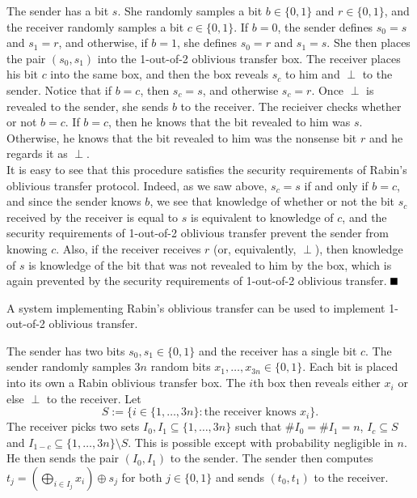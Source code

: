 \proof
The sender has a bit $s$. She randomly samples a bit $b \in \{0,1\}$ and $r \in \{0,1\}$, and the receiver randomly samples a bit $c \in \{0,1\}$. If $b = 0$, the sender defines $s_0 = s$ and $s_1 = r$, and otherwise, if $b = 1$, she defines $s_0 = r$ and $s_1 = s$. She then places the pair $(s_0, s_1)$ into the 1-out-of-2 oblivious transfer box. The receiver places his bit $c$ into the same box, and then the box reveals $s_c$ to him and $\perp$ to the sender. Notice that if $b = c$, then $s_c = s$, and otherwise $s_c = r$. Once $\perp$ is revealed to the sender, she sends $b$ to the receiver. The recieiver checks whether or not $b = c$. If $b = c$, then he knows that the bit revealed to him was $s$. Otherwise, he knows that the bit revealed to him was the nonsense bit $r$ and he regards it as $\perp$. \\

It is easy to see that this procedure satisfies the security requirements of Rabin's oblivious transfer protocol. Indeed, as we saw above, $s_c = s$ if and only if $b = c$, and since the sender knows $b$, we see that knowledge of whether or not the bit $s_c$ received by the receiver is equal to $s$ is equivalent to knowledge of $c$, and the security requirements of 1-out-of-2 oblivious transfer prevent the sender from knowing $c$. Also, if the receiver receives $r$ (or, equivalently, $\perp$), then knowledge of $s$ is knowledge of the bit that was not revealed to him by the box, which is again prevented by the security requirements of 1-out-of-2 oblivious transfer.  $\qed$

\begin{lemma}
A system implementing Rabin's oblivious transfer can be used to implement 1-out-of-2 oblivious transfer.
\end{lemma}

\proofsketch
The sender has two bits $s_0, s_1 \in \{0,1\}$ and the receiver has a single bit $c$. The sender randomly samples $3n$ random bits $x_1, \dotsc, x_{3n} \in \{0,1\}$. Each bit is placed into its own a Rabin oblivious transfer box. The $i$th box then reveals either $x_i$ or else $\perp$ to the receiver. Let 
\[ S := \{i \in \{1, \dotsc, 3n\} : \text{the receiver knows } x_i\}. \]
The receiver picks two sets $I_0, I_1 \subseteq \{1, \dotsc, 3n\}$ such that $\# I_0 = \# I_1 = n$, $I_c \subseteq S$ and $I_{1-c} \subseteq \{1, \dotsc, 3n\} \setminus S$. This is possible except with probability negligible in $n$. He then sends the pair $(I_0, I_1)$ to the sender. The sender then computes $t_j= \left(\bigoplus_{i \in I_j}x_i \right) \oplus s_j$ for both $j \in \{0,1\}$ and sends $(t_0, t_1)$ to the receiver. \\

